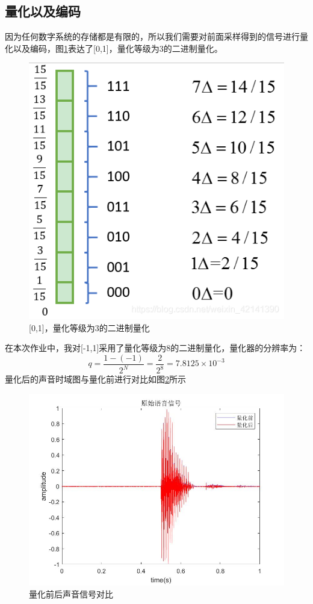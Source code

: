 \documentclass{../source/zju}
\begin{document}
        \subsection{量化以及编码}
        因为任何数字系统的存储都是有限的，所以我们需要对前面采样得到的信号进行量化以及编码，图\ref{量化示意}表达了[0,1]，量化等级为3的二进制量化。
        \begin{figure}[H]
            \centering
            \includegraphics[scale = 0.3]{figure/量化示例.png}
            \caption{[0,1]，量化等级为3的二进制量化}
            \label{量化示意}
        \end{figure}
        在本次作业中，我对[-1,1]采用了量化等级为8的二进制量化，量化器的分辨率为：
        $$q = \frac{1-(-1)}{2^N} = \frac{2}{2^8} = 7.8125\times10^{-3}$$
        量化后的声音时域图与量化前进行对比如图\ref{量化对比}所示
        \begin{figure}[H]
            \centering
            \includegraphics[scale = 0.3]{figure/量化后.jpg}
            \caption{量化前后声音信号对比}
            \label{量化对比}
        \end{figure}
\end{document}
